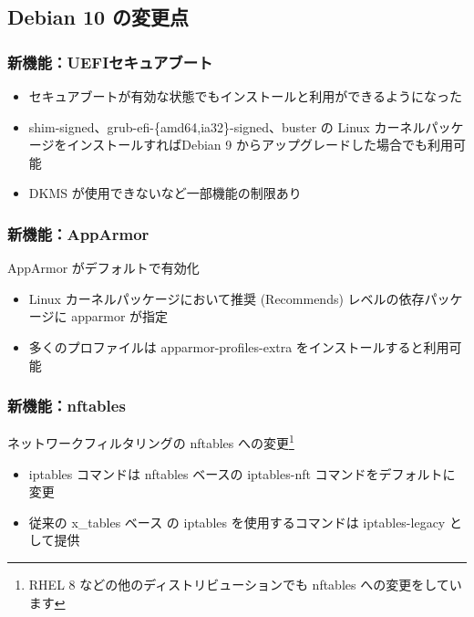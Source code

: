 \documentclass[mingoth,a4paper]{jsarticle}
\begin{document}

\subsection{Debian 10 の変更点}


\subsubsection{新機能：UEFIセキュアブート}

\begin{itemize}
\item セキュアブートが有効な状態でもインストールと利用ができるようになった
\item shim-signed、grub-efi-\{amd64,ia32\}-signed、buster の Linux カーネルパッケージをインストールすればDebian 9 からアップグレードした場合でも利用可能
\item DKMS が使用できないなど一部機能の制限あり
\end{itemize}
    



\subsubsection{新機能：AppArmor}

AppArmor がデフォルトで有効化

\begin{itemize}
\item Linux カーネルパッケージにおいて推奨 (Recommends) レベルの依存パッケージに apparmor が指定
\item 多くのプロファイルは apparmor-profiles-extra をインストールすると利用可能
\end{itemize}
    



\subsubsection{新機能：nftables}

ネットワークフィルタリングの nftables への変更\footnote{RHEL 8 などの他のディストリビューションでも nftables への変更をしています}
  
\begin{itemize}
\item iptables コマンドは nftables ベースの iptables-nft コマンドをデフォルトに変更
\item 従来の x\_tables ベース の iptables を使用するコマンドは iptables-legacy として提供
\end{itemize}
    
\end{document}

